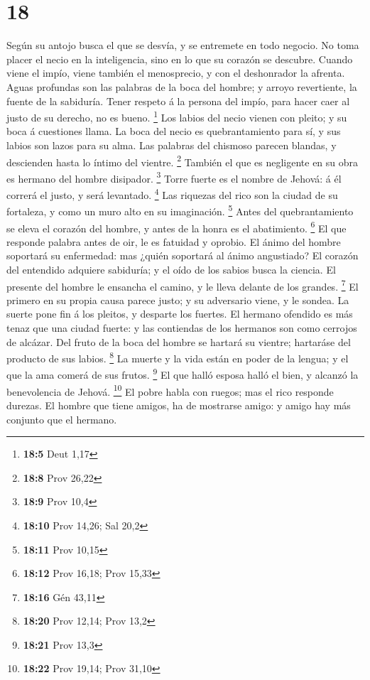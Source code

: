 \hypertarget{section-17}{%
\section{18}\label{section-17}}

 Según su antojo busca el que se desvía, y se entremete en
todo negocio.  No toma placer el necio en la inteligencia,
sino en lo que su corazón se descubre.  Cuando viene el
impío, viene también el menosprecio, y con el deshonrador la afrenta.
 Aguas profundas son las palabras de la boca del hombre; y
arroyo revertiente, la fuente de la sabiduría.  Tener
respeto á la persona del impío, para hacer caer al justo de su derecho,
no es bueno. \footnote{\textbf{18:5} Deut 1,17}  Los labios
del necio vienen con pleito; y su boca á cuestiones llama. 
La boca del necio es quebrantamiento para sí, y sus labios son lazos
para su alma.  Las palabras del chismoso parecen blandas, y
descienden hasta lo íntimo del vientre. \footnote{\textbf{18:8} Prov
  26,22}  También el que es negligente en su obra es hermano
del hombre disipador. \footnote{\textbf{18:9} Prov 10,4} 
Torre fuerte es el nombre de Jehová: á él correrá el justo, y será
levantado. \footnote{\textbf{18:10} Prov 14,26; Sal 20,2} 
Las riquezas del rico son la ciudad de su fortaleza, y como un muro alto
en su imaginación. \footnote{\textbf{18:11} Prov 10,15} 
Antes del quebrantamiento se eleva el corazón del hombre, y antes de la
honra es el abatimiento. \footnote{\textbf{18:12} Prov 16,18; Prov 15,33}
 El que responde palabra antes de oir, le es fatuidad y
oprobio.  El ánimo del hombre soportará su enfermedad: mas
¿quién soportará al ánimo angustiado?  El corazón del
entendido adquiere sabiduría; y el oído de los sabios busca la ciencia.
 El presente del hombre le ensancha el camino, y le lleva
delante de los grandes. \footnote{\textbf{18:16} Gén 43,11}
 El primero en su propia causa parece justo; y su
adversario viene, y le sondea.  La suerte pone fin á los
pleitos, y desparte los fuertes.  El hermano ofendido es
más tenaz que una ciudad fuerte: y las contiendas de los hermanos son
como cerrojos de alcázar.  Del fruto de la boca del hombre
se hartará su vientre; hartaráse del producto de sus labios. \footnote{\textbf{18:20}
  Prov 12,14; Prov 13,2}  La muerte y la vida están en
poder de la lengua; y el que la ama comerá de sus frutos. \footnote{\textbf{18:21}
  Prov 13,3}  El que halló esposa halló el bien, y alcanzó
la benevolencia de Jehová. \footnote{\textbf{18:22} Prov 19,14; Prov
  31,10}  El pobre habla con ruegos; mas el rico responde
durezas.  El hombre que tiene amigos, ha de mostrarse
amigo: y amigo hay más conjunto que el hermano.

